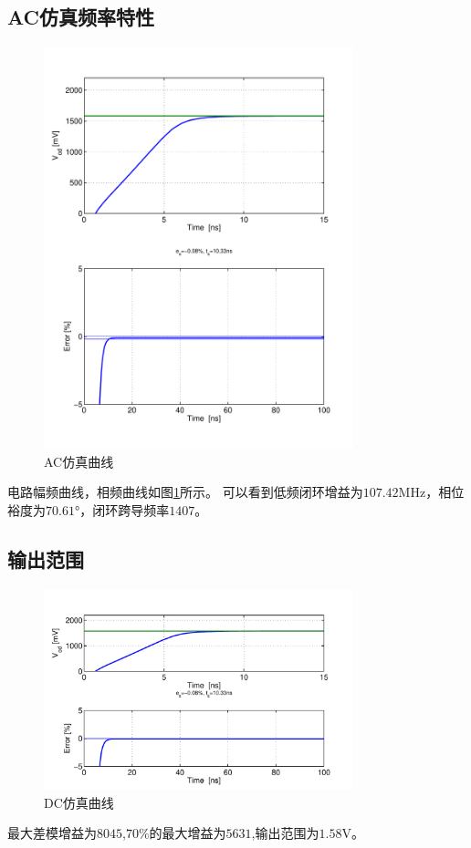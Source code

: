 \documentclass[a4paper]{article}
\newcommand{\uV}{\si{\volt}}
\newcommand{\uMHz}{\si{\mega\hertz}}
\newcommand{\udeg}{\si{\degree}}
\begin{document}
\subsection{AC仿真频率特性}
\begin{figure}[htb]
    \begin{center}
        \includegraphics[width=0.8\textwidth]{common/ac.pdf}
    \end{center}
    \caption{AC仿真曲线}
    \label{commonac}
\end{figure}
电路幅频曲线，相频曲线如图\ref{commonac}所示。
可以看到低频闭环增益为$107.42\uMHz$，相位裕度为$70.61\udeg$，闭环跨导频率$1407$。
\newpage
\clearpage
\subsection{输出范围}
\begin{figure}[htb]
    \begin{center}
        \includegraphics[width=0.8\textwidth]{common/dc.pdf}
    \end{center}
    \caption{DC仿真曲线}
    \label{commondc}
\end{figure}
最大差模增益为$8045$,$70\%$的最大增益为$5631$,输出范围为$1.58\uV$。
\newpage
\clearpage
\end{document}
